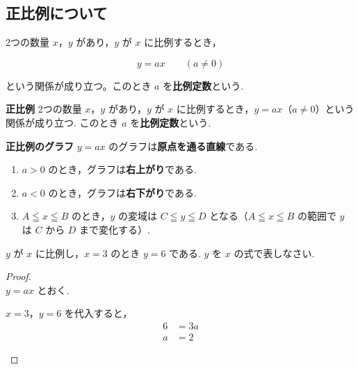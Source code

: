 \subsection{正比例について}

2つの数量 $x$，$y$ があり，$y$ が $x$ に比例するとき，

\[y = ax \qquad (a \neq 0)\]

という関係が成り立つ。このとき $a$ を\textbf{比例定数}という.

\begin{definitionbox}{\textbf{正比例}}
    2つの数量 $x$，$y$ があり，$y$ が $x$ に比例するとき，$y = ax$（$a \neq 0$）という関係が成り立つ.
    このとき $a$ を\textbf{比例定数}という.
\end{definitionbox}

\begin{theorembox}{\textbf{正比例のグラフ}}
    $y = ax$ のグラフは\textbf{原点を通る直線}である.
    \begin{enumerate}
        \item $a > 0$ のとき，グラフは\textbf{右上がり}である.
        \item $a < 0$ のとき，グラフは\textbf{右下がり}である.
        \item $A \leqq x \leqq B$ のとき，$y$ の変域は $C \leqq y \leqq D$ となる（$A \leqq x \leqq B$ の範囲で $y$ は $C$ から $D$ まで変化する）.
    \end{enumerate}
\end{theorembox}

\begin{example}[【例題 1】]
    $y$ が $x$ に比例し，$x = 3$ のとき $y = 6$ である. $y$ を $x$ の式で表しなさい.
\end{example}

\begin{proof}\mbox{}\\
    $y = ax$ とおく.

    \begin{hiddenanswer}
        $x = 3$，$y = 6$ を代入すると，
        \begin{align*}
            6 &= 3a \\
            a &= 2
        \end{align*}
    \end{hiddenanswer}
\end{proof}

\newpage
